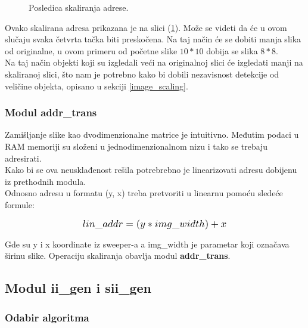 \begin{figure}[H]
  \centering
  \resizebox{.4\textwidth}{!}{%
    
  }
  \caption{Posledica skaliranja adrese.}
  \label{hop_sweep_scale}
\end{figure}

Ovako skalirana adresa prikazana je na slici (\ref{hop_sweep_scale}).
Može se videti da će u ovom slučaju svaka četvrta tačka biti preskočena.
Na taj način će se dobiti manja slika od originalne, u ovom primeru od početne
slike $10*10$ dobija se slika $8*8$. \\
Na taj način objekti koji su izgledali veći na originalnoj slici će izgledati
manji na skaliranoj slici, što nam je potrebno kako bi dobili nezavisnost
detekcije od veličine objekta, opisano u sekciji \ref{image_scaling}.

\subsubsection{Modul addr\_trans}\label{addr_trans_sec}

Zamišljanje slike kao dvodimenzionalne matrice je intuitivno.
Međutim podaci u RAM memoriji su složeni u jednodimenzionalnom nizu i tako se
trebaju adresirati. \\
Kako bi se ova neusklađenost rešila potrebrebno je linearizovati adresu dobijenu
iz prethodnih modula. \\
Odnosno adresu u formatu (y, x) treba pretvoriti u linearnu pomoću sledeće formule:

\begin{equation}
  \Scale[1.2]{lin\_addr = (y * img\_width) + x}
  \label{IntegralImage_eq2}
\end{equation}

\noindent
Gde su y i x koordinate iz sweeper-a a img\_width je parametar koji označava
širinu slike.
Operaciju skaliranja obavlja modul \textbf{addr\_trans}. \\

\subsection{Modul ii\_gen i sii\_gen} \label{ii_sii_gen_sec}

\subsubsection{Odabir algoritma}\label{ii_alg_sel_sec}

